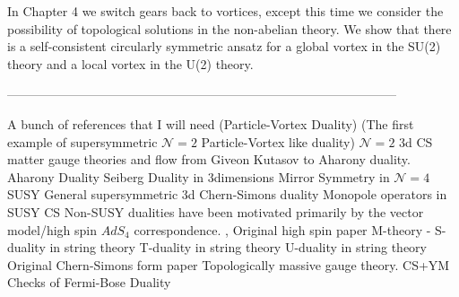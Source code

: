     In Chapter 4 we switch gears back to vortices, except this time we consider the possibility of topological solutions in the non-abelian theory. We show that there is a self-consistent circularly symmetric ansatz for a global vortex in the SU(2) theory and a local vortex in the U(2) theory.


---------------------------------------------------------------------------------------------

A bunch of references that I will need (Particle-Vortex Duality) \cite{Peskin:1977kp, Dasgupta:1981zz, PhysRevB.39.2756} 
(The first example of supersymmetric $\mathcal{N}=2$ Particle-Vortex like duality) \cite{Aharony:1997bx}
$\mathcal{N}=2$ 3d CS matter gauge theories and flow from Giveon Kutasov to Aharony duality.\cite{Intriligator:2013lca}
Aharony Duality \cite{Aharony:1997gp}
Seiberg Duality in 3dimensions \cite{Karch:1997ux}
Mirror Symmetry in $\mathcal{N}=4$ SUSY \cite{Intriligator:1996ex}
General supersymmetric 3d Chern-Simons duality \cite{Aharony:2014uya}
Monopole operators in SUSY CS \cite{Aharony:2015pla, Borokhov:2002cg}
Non-SUSY dualities have been motivated primarily by the vector model/high spin $AdS_4$ correspondence. \cite{Sezgin:2003pt, Klebanov:2002ja}, Original high spin paper \cite{Vasiliev:1992av}
M-theory  - \cite{Witten:1995ex}
S-duality in string theory \cite{Sen:1994fa} \cite{Schwarz:1994xn}
T-duality in string theory  \cite{Sathiapalan:1986zb}
U-duality in string theory \cite{Hull:1994ys}
Original Chern-Simons form paper  \cite{Chern:1974ft}
Topologically massive gauge theory. CS+YM \cite{Deser:1982vy, Deser:1981wh}
Checks of Fermi-Bose Duality \cite{Aharony:2012nh, Giombi:2011kc, Aharony:2011jz}


%
%
%

